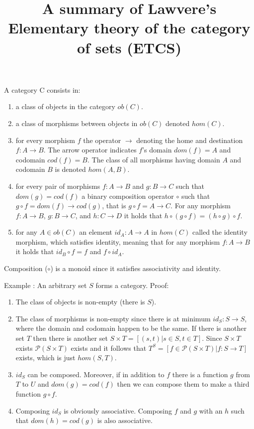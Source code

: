 \documentclass[a4paper, 12pt]{article}
\title{A summary of Lawvere's Elementary theory of the category of sets (ETCS)}
\begin{document}
\maketitle

A category C consists in:
\begin{enumerate}
    \item a class of objects in the category $ob(C)$.
    \item a class of morphisms between objects in $ob(C)$ denoted $hom(C)$.
    \item for every morphism $f$ the operator $\longrightarrow$ denoting the home and destination $f: A \longrightarrow B$. The arrow operator indicates $f$'s domain $dom (f) = A$ and codomain $cod (f) = B$. The class of all morphisms having domain $A$ and codomain $B$ is denoted $hom(A,B)$.
    \item for every pair of morphisms $f: A \longrightarrow B$ and $g: B \longrightarrow C$ such that $dom (g) = cod (f)$ a binary composition operator $\circ$ such that $g \circ f = dom (f) \longrightarrow cod (g)$, that is $g \circ f = A \longrightarrow C$. For any morphism $f: A \longrightarrow B$, $g: B \longrightarrow C$, and $h: C \longrightarrow D$ it holds that $h \circ (g \circ f) = (h \circ g) \circ f$.
    \item for any $A \in ob(C)$ an element $id_{A}: A \longrightarrow A$ in $hom(C)$ called the identity morphism, which satisfies identity, meaning that for any morphism $f: A \longrightarrow B$ it holds that $id_{B} \circ f = f$ and $f \circ id_{A}$.
\end{enumerate}
Composition ($\circ$) is a monoid since it satisfies associativity and identity.

Example : An arbitrary set $S$ forms a category. Proof:
\begin{enumerate}
    \item The class of objects is non-empty (there is $S$).
    \item The class of morphisms is non-empty since there is at minimum $id_{S}: S \longrightarrow S$, where the domain and codomain happen to be the same. If there is another set $T$ then there is another set $S \times T = [(s,t) | s \in S, t \in T]$. Since $S \times T$ exists $\mathcal{P}(S \times T)$ exists and it follows that $T^{S} = [f \in \mathcal{P}(S \times T)| f: S \longrightarrow T]$ exists, which is just $hom(S,T)$.
    \item $id_{S}$ can be composed. Moreover, if in addition to $f$ there is a function $g$ from $T$ to $U$ and $dom(g) = cod(f)$ then we can compose them to make a third function $g \circ f$.
    \item Composing $id_{S}$ is obviously associative. Composing $f$ and $g$ with an $h$ such that $dom(h) = cod(g)$ is also associative.
\end{enumerate}
\end{document}
